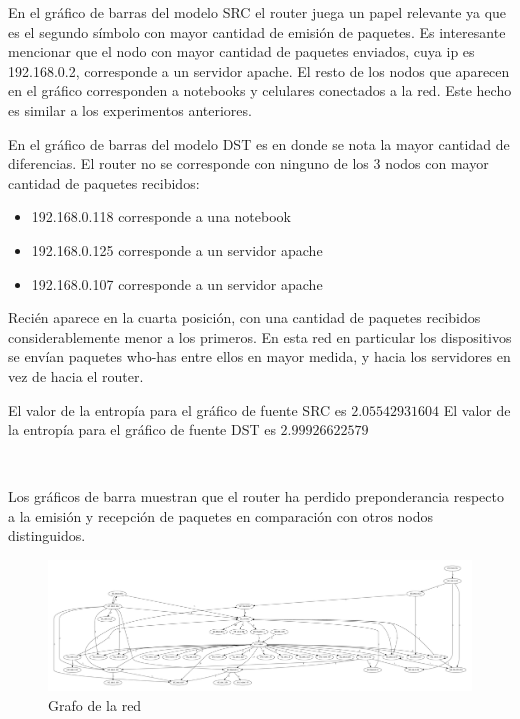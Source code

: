 En el gráfico de barras del modelo SRC el router juega un papel relevante ya que es el segundo símbolo con mayor cantidad de emisión de paquetes. Es interesante mencionar que el 
nodo con mayor cantidad de paquetes enviados, cuya ip es 192.168.0.2, corresponde a un servidor apache. El resto de los nodos que aparecen en el gráfico corresponden a notebooks
y celulares conectados a la red. Este hecho es similar a los experimentos anteriores.

En el gráfico de barras del modelo DST es en donde se nota la mayor cantidad de diferencias. El router no se corresponde con ninguno de los 3 nodos con mayor cantidad de paquetes
recibidos:

\begin{itemize}
    \item 192.168.0.118 corresponde a una notebook
    \item 192.168.0.125 corresponde a un servidor apache
    \item 192.168.0.107 corresponde a un servidor apache
\end{itemize}

Recién aparece en la cuarta posición, con una cantidad de paquetes recibidos considerablemente menor a los primeros. En esta red en particular los dispositivos se envían paquetes
who-has entre ellos en mayor medida, y hacia los servidores en vez de hacia el router.

El valor de la entropía para el gráfico de fuente SRC es $2.05542931604$
El valor de la entropía para el gráfico de fuente DST es $2.99926622579$


~

Los gráficos de barra muestran que el router ha perdido preponderancia respecto a la emisión y recepción de paquetes en comparación con otros nodos distinguidos.

\begin{figure}
\vspace{-35pt}
\hspace{-35pt}
\centering
   \includegraphics[width=1\textwidth]{resultados/empresa/conectividad.pdf}
\vspace{-30pt}
   \caption{Grafo de la red}
\end{figure}

